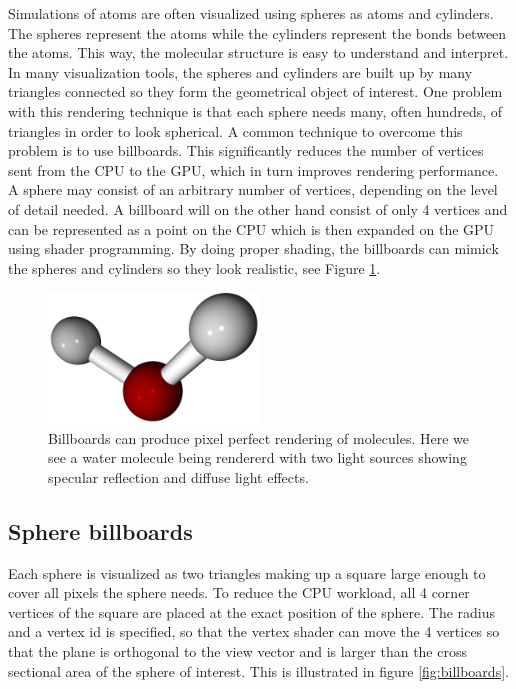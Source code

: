 \documentclass[aps,pre,twocolumn,letterpaper,floatfix,nofootinbib]{revtex4}
\begin{document}
Simulations of atoms are often visualized using spheres as atoms and cylinders.
The spheres represent the atoms while the cylinders represent the bonds between
the atoms.
This way, the molecular structure is easy to understand and interpret.
In many visualization tools, the spheres and cylinders are built up by many
triangles connected so they form the geometrical object of interest.
One problem with this rendering technique is that each sphere needs many,
often hundreds, of triangles in order to look spherical.
A common technique to overcome this problem is to use billboards.
This significantly reduces the number of vertices sent from the CPU to the GPU,
which in turn improves rendering performance.
A sphere may consist of an arbitrary number of vertices,
depending on the level of detail needed.
A billboard will on the other hand consist of only 4 vertices and can be
represented as a point on the CPU which is then expanded on the GPU using shader
programming.
By doing proper shading, the billboards can mimick the spheres and cylinders so
they look realistic, see Figure \ref{fig:final_billboards}.

\begin{figure}
	\centering
	\includegraphics[width=0.5\textwidth]{final_billboard.png}
	\caption{Billboards can produce pixel perfect rendering of molecules. Here we see a water molecule being rendererd with two light sources showing specular reflection and diffuse light effects.}
	\label{fig:final_billboards}
\end{figure}

\subsection{Sphere billboards}

Each sphere is visualized as two triangles making up a square large enough to
cover all pixels the sphere needs.
To reduce the CPU workload, all 4 corner vertices of the square are placed at
the exact position of the sphere.
The radius and a vertex id is specified, so that the vertex shader can move the
4 vertices so that the plane is orthogonal to the view vector and is larger than
the cross sectional area of the sphere of interest.
This is illustrated in figure \ref{fig:billboards}.
\end{document}
